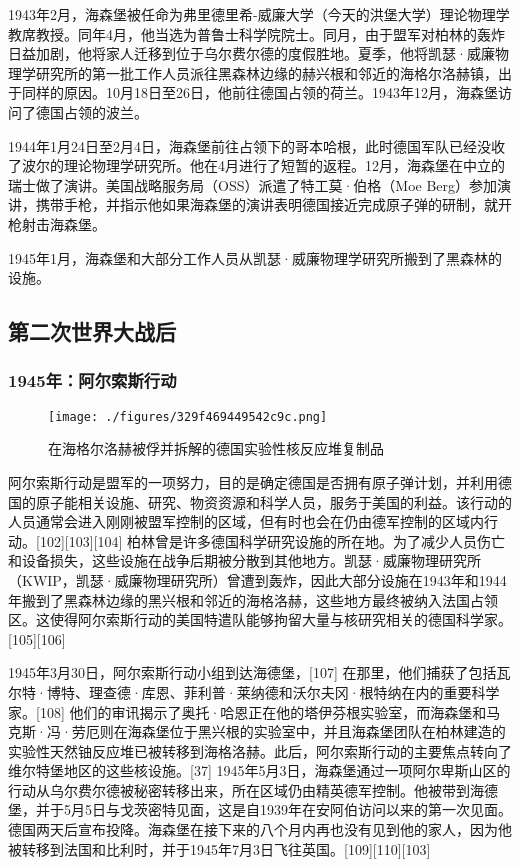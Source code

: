 1943年2月，海森堡被任命为弗里德里希-威廉大学（今天的洪堡大学）理论物理学教席教授。同年4月，他当选为普鲁士科学院院士。同月，由于盟军对柏林的轰炸日益加剧，他将家人迁移到位于乌尔费尔德的度假胜地。夏季，他将凯瑟·威廉物理学研究所的第一批工作人员派往黑森林边缘的赫兴根和邻近的海格尔洛赫镇，出于同样的原因。10月18日至26日，他前往德国占领的荷兰。1943年12月，海森堡访问了德国占领的波兰。

1944年1月24日至2月4日，海森堡前往占领下的哥本哈根，此时德国军队已经没收了波尔的理论物理学研究所。他在4月进行了短暂的返程。12月，海森堡在中立的瑞士做了演讲。美国战略服务局（OSS）派遣了特工莫·伯格（Moe Berg）参加演讲，携带手枪，并指示他如果海森堡的演讲表明德国接近完成原子弹的研制，就开枪射击海森堡。

1945年1月，海森堡和大部分工作人员从凯瑟·威廉物理学研究所搬到了黑森林的设施。
\subsection{第二次世界大战后} 
\subsubsection{1945年：阿尔索斯行动}
\begin{figure}[ht]
\centering
\texttt{[image: ./figures/329f469449542c9c.png]}
\caption{在海格尔洛赫被俘并拆解的德国实验性核反应堆复制品} \label{fig_Heisen_2}
\end{figure}
阿尔索斯行动是盟军的一项努力，目的是确定德国是否拥有原子弹计划，并利用德国的原子能相关设施、研究、物资资源和科学人员，服务于美国的利益。该行动的人员通常会进入刚刚被盟军控制的区域，但有时也会在仍由德军控制的区域内行动。[102][103][104] 柏林曾是许多德国科学研究设施的所在地。为了减少人员伤亡和设备损失，这些设施在战争后期被分散到其他地方。凯瑟·威廉物理研究所（KWIP，凯瑟·威廉物理研究所）曾遭到轰炸，因此大部分设施在1943年和1944年搬到了黑森林边缘的黑兴根和邻近的海格洛赫，这些地方最终被纳入法国占领区。这使得阿尔索斯行动的美国特遣队能够拘留大量与核研究相关的德国科学家。[105][106]

1945年3月30日，阿尔索斯行动小组到达海德堡，[107] 在那里，他们捕获了包括瓦尔特·博特、理查德·库恩、菲利普·莱纳德和沃尔夫冈·根特纳在内的重要科学家。[108] 他们的审讯揭示了奥托·哈恩正在他的塔伊芬根实验室，而海森堡和马克斯·冯·劳厄则在海森堡位于黑兴根的实验室中，并且海森堡团队在柏林建造的实验性天然铀反应堆已被转移到海格洛赫。此后，阿尔索斯行动的主要焦点转向了维尔特堡地区的这些核设施。[37] 1945年5月3日，海森堡通过一项阿尔卑斯山区的行动从乌尔费尔德被秘密转移出来，所在区域仍由精英德军控制。他被带到海德堡，并于5月5日与戈茨密特见面，这是自1939年在安阿伯访问以来的第一次见面。德国两天后宣布投降。海森堡在接下来的八个月内再也没有见到他的家人，因为他被转移到法国和比利时，并于1945年7月3日飞往英国。[109][110][103]
